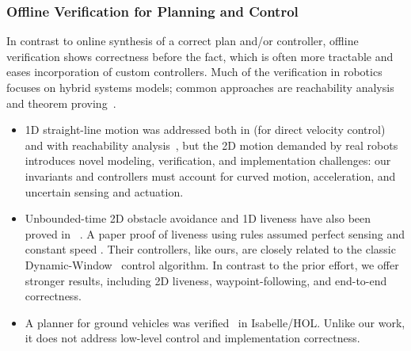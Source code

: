 \documentclass[12pt]{cmuthesis}
\theoremstyle{definition}
\theoremstyle{remark}
\newcommand{\VeriPhy}{VeriPhy\xspace}
\begin{document}
\subsubsection{Offline Verification for Planning and Control}
In contrast to online synthesis of a correct plan and/or controller, offline verification shows correctness before the fact, which is often more tractable and eases incorporation of custom controllers.
Much of the verification in robotics focuses on hybrid systems models;
common approaches are reachability analysis~\cite{DBLP:conf/cav/FrehseGDCRLRGDM11} and theorem proving~\cite{DBLP:conf/cade/FultonMQVP15}.
\begin{itemize}
\item 1D straight-line motion was addressed both in \dL (for direct velocity control)~\cite{DBLP:conf/pldi/BohrerTMMP18} and with reachability analysis~\cite{chen2015benchmark},
 but the 2D motion demanded by real robots introduces novel modeling, verification, and implementation challenges: our invariants and controllers must account for curved motion, acceleration, and uncertain sensing and actuation.
\item
 Unbounded-time 2D obstacle avoidance and 1D liveness have also been proved in \dL~\cite{DBLP:conf/rss/MitschGP13,DBLP:journals/ijrr/MitschGVP17}.
A paper proof of liveness using \dL rules assumed perfect sensing and constant speed \cite{DBLP:journals/corr/abs-1709-02561}.
 Their controllers, like ours, are closely related to the classic Dynamic-Window~\cite{DBLP:journals/ram/FoxBT97} control algorithm.
 In contrast to the prior \dL effort, we offer stronger results, including 2D liveness, waypoint-following, and end-to-end correctness.
\item
  A planner for ground vehicles was verified~\cite{DBLP:conf/atva/RizaldiISA18} in Isabelle/HOL.
  Unlike our work, it does not address low-level control and implementation correctness.%
\end{itemize}
\end{document}
